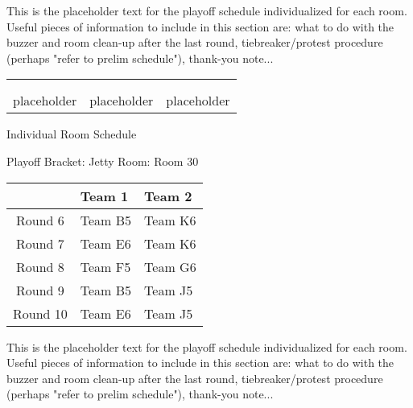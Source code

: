 \documentclass{article}%
\begin{document}
\vspace*{16pt}%
\linebreak%
This is the placeholder text for the playoff schedule individualized for each room. Useful pieces of information to include in this section are: what to do with the buzzer and room clean{-}up after the last round, tiebreaker/protest procedure (perhaps "refer to prelim schedule"), thank{-}you note...%
\vspace*{30pt}%
\newline%
%
\begin{tabularx}{\textwidth}{YYY}%
  &  &  \\%
\\%
placeholder&placeholder&placeholder\\%
\end{tabularx}%
\newpage%
\begin{center}%
\begin{Huge}%
Individual Room Schedule%
\end{Huge}%
\vspace*{16pt}%
\linebreak%
\begin{Large}%
Playoff Bracket: Jetty \hfill Room: Room 30%
\end{Large}%
\end{center}%
%
\begin{tabularx}{\textwidth}{|c|Y|Y|}%
\hline%
&Team 1&Team 2\\%
\hline%
Round 6&Team B5&Team K6\\%
Round 7&Team E6&Team K6\\%
Round 8&Team F5&Team G6\\%
Round 9&Team B5&Team J5\\%
Round 10&Team E6&Team J5\\%
\hline%
\end{tabularx}%
\vspace*{16pt}%
\linebreak%
This is the placeholder text for the playoff schedule individualized for each room. Useful pieces of information to include in this section are: what to do with the buzzer and room clean{-}up after the last round, tiebreaker/protest procedure (perhaps "refer to prelim schedule"), thank{-}you note...%
\vspace*{30pt}%
\newline%
\end{document}
